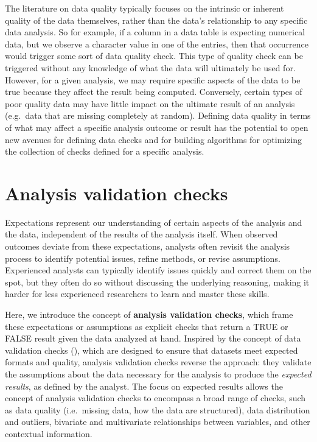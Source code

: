 \documentclass[
  12pt,
]{interact}
\begin{document}
The literature on data quality typically focuses on the intrinsic or
inherent quality of the data themselves, rather than the data's
relationship to any specific data analysis. So for example, if a column
in a data table is expecting numerical data, but we observe a character
value in one of the entries, then that occurrence would trigger some
sort of data quality check. This type of quality check can be triggered
without any knowledge of what the data will ultimately be used for.
However, for a given analysis, we may require specific aspects of the
data to be true because they affect the result being computed.
Conversely, certain types of poor quality data may have little impact on
the ultimate result of an analysis (e.g.~data that are missing
completely at random). Defining data quality in terms of what may affect
a specific analysis outcome or result has the potential to open new
avenues for defining data checks and for building algorithms for
optimizing the collection of checks defined for a specific analysis.

\section{Analysis validation checks}\label{sec-plan}

Expectations represent our understanding of certain aspects of the
analysis and the data, independent of the results of the analysis
itself. When observed outcomes deviate from these expectations, analysts
often revisit the analysis process to identify potential issues, refine
methods, or revise assumptions. Experienced analysts can typically
identify issues quickly and correct them on the spot, but they often do
so without discussing the underlying reasoning, making it harder for
less experienced researchers to learn and master these skills.

Here, we introduce the concept of \textbf{analysis validation checks},
which frame these expectations or assumptions as explicit checks that
return a TRUE or FALSE result given the data analyzed at hand. Inspired
by the concept of data validation checks (\citet{validate}), which are
designed to ensure that datasets meet expected formats and quality,
analysis validation checks reverse the approach: they validate the
assumptions about the data necessary for the analysis to produce the
\emph{expected results}, as defined by the analyst. The focus on
expected results allows the concept of analysis validation checks to
encompass a broad range of checks, such as data quality (i.e.~missing
data, how the data are structured), data distribution and outliers,
bivariate and multivariate relationships between variables, and other
contextual information.
\end{document}
